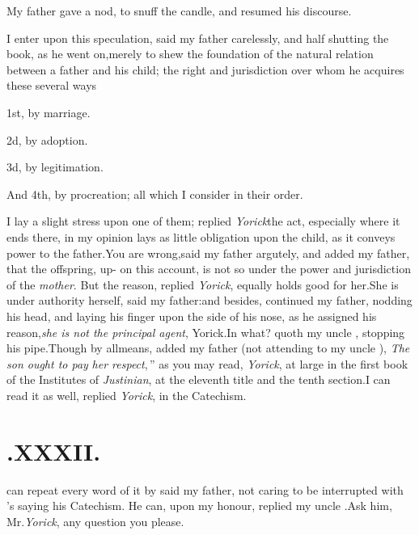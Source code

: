 \documentclass[twoside]{article}
\begin{document}
\etpp
My father gave \trim a nod, to snuff the candle, and
resumed his discourse.

\tsh I enter upon this speculation, said my father
carelessly, and half shutting the book, as he went on,\tsk merely to
shew the foundation of the natural relation between a father and
his child; the right and jurisdiction over whom he acquires these
several ways\tsk

1st, by marriage.

2d, by adoption.

3d, by legitimation.

And 4th, by procreation; all which I consider in their
order.

I lay a slight stress upon one of them; replied
\textit{Yorick}\tsh the act, especially where it ends there,
in my opinion lays as little obligation upon the child, as it
conveys power to the father.\tsk You are wrong,\tsk said my
father argutely, and 
\stick{\astfill}
added my father, that the offspring, up-\break 
on this account, is not so under the\break
power and jurisdiction of the \textit{mother}.\tsk\break
But
the reason, replied \textit{Yorick}, equally holds good for
her.\tsk She is under authority herself, said my
father:\tsk and\break
besides, continued my father, nodding his head, and laying his finger
upon the side of his nose, as he assigned his reason,\tsk \textit{she is
not the principal agent}, Yorick.\tsk In what? quoth my uncle
\toby, stopping his pipe.\tsk Though by all\break means, added my
father (not attending to my uncle \toby), \lqq \textit{The son
ought to pay}\break
\lqq\textit{her respect},\,” as you may read, \textit{Yorick},\break
at large in the first book of the Institutes of \textit{Justinian}, at
the eleventh title and the tenth section.\tsk I can read it as well,
replied \textit{Yorick}, in the Catechism.

\vfill
{}
\newpage
\null{}\baselineskip
\section{.\enspace  XXXII.}

 can repeat
every word of it by \break
said my father, not caring to be interrupted with \trim's saying his
Catechism. He can, upon my honour, replied my\break
uncle \toby.\tsk Ask him, Mr.\@ \textit{Yorick}, any question you please.\tsh
\end{document}

